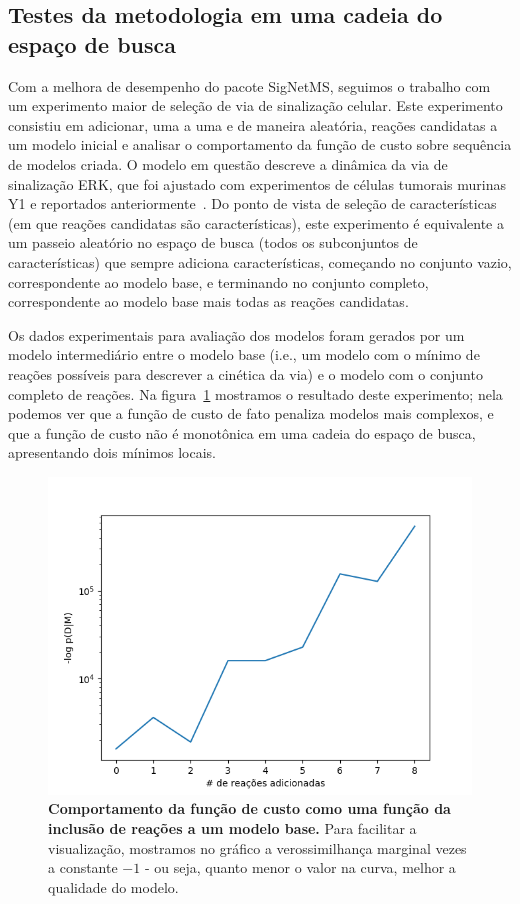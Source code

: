 \documentclass[12pt]{article}
\begin{document}
\subsection{Testes da metodologia em uma cadeia do espaço de busca}  \label{sec:ERK}
Com a melhora de desempenho do pacote SigNetMS, seguimos o trabalho com
um experimento maior de seleção de via de sinalização celular. Este
experimento consistiu em adicionar, uma a uma e de maneira aleatória, 
reações candidatas a um modelo inicial e analisar o comportamento da 
função de custo sobre sequência de modelos criada. O modelo em questão descreve a dinâmica da via de sinalização ERK, que foi ajustado com experimentos de células tumorais murinas Y1 e reportados anteriormente~\cite{Reis2017interdisciplinary}. Do ponto de vista de
seleção de características (em que reações candidatas são
características), este experimento é equivalente a um passeio aleatório
no espaço de busca (todos os subconjuntos de características) que sempre
adiciona características, começando no conjunto vazio, correspondente ao
modelo base, e terminando no conjunto completo, correspondente ao modelo
base mais todas as reações candidatas.

Os dados experimentais para avaliação dos modelos foram gerados por um
modelo intermediário entre o modelo base (i.e., um modelo com o mínimo de reações possíveis para descrever a cinética da via) e o modelo com o conjunto
completo de reações. Na figura~\ref{fig:random_walk} mostramos o resultado 
deste experimento; nela podemos ver que a função de custo de fato 
penaliza modelos mais complexos, e que a função de custo não é monotônica em uma cadeia do espaço de busca, apresentando dois mínimos locais.

\begin{figure}[h!]
    \includegraphics[clip=true]{experiments/surface_curve.png}
    \caption{{\bf Comportamento da função de custo como uma função da inclusão de reações a um modelo base.} Para facilitar a
    visualização, mostramos no gráfico a verossimilhança marginal vezes 
    a constante $-1$ - ou seja, quanto menor o valor na curva, melhor a
    qualidade do modelo. 
    }
    \label{fig:random_walk}
\end{figure}
\end{document}
